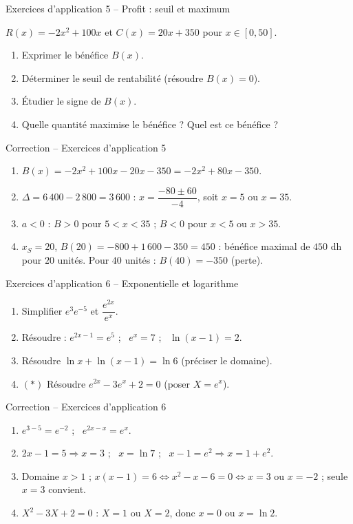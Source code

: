 \documentclass[aspectratio=169,11pt]{beamer}
\begin{document}
\begin{frame}{Exercices d'application 5 -- Profit : seuil et maximum}
	\begin{exercicebox}\small
		$R(x)=-2x^2+100x$ et $C(x)=20x+350$ pour $x\in[0,50]$.
		\begin{enumerate}
			\item Exprimer le bénéfice $B(x)$.
			\item Déterminer le seuil de rentabilité (résoudre $B(x)=0$).
			\item Étudier le signe de $B(x)$.
			\item Quelle quantité maximise le bénéfice ? Quel est ce bénéfice ?
		\end{enumerate}
	\end{exercicebox}
\end{frame}

\begin{frame}{Correction -- Exercices d'application 5}
	\small
	\begin{enumerate}
		\item $B(x)=-2x^2+100x-20x-350=-2x^2+80x-350$.
		\item $\Delta=6\,400-2\,800=3\,600$ : $x=\dfrac{-80\pm60}{-4}$, soit $x=5$ ou $x=35$.
		\item $a<0$ : $B>0$ pour $5<x<35$ ; $B<0$ pour $x<5$ ou $x>35$.
		\item $x_S=20$, $B(20)=-800+1\,600-350=450$ : bénéfice maximal de $450$ dh pour $20$ unités. Pour $40$ unités : $B(40)=-350$ (perte).
	\end{enumerate}
\end{frame}

\begin{frame}{Exercices d'application 6 -- Exponentielle et logarithme}
	\begin{exercicebox}\small
		\begin{enumerate}
			\item Simplifier $e^{3}e^{-5}$ et $\dfrac{e^{2x}}{e^{x}}$.
			\item Résoudre : $e^{2x-1}=e^5$ ; \ $e^x=7$ ; \ $\ln(x-1)=2$.
			\item Résoudre $\ln x+\ln(x-1)=\ln 6$ (préciser le domaine).
			\item $(\ast)$ Résoudre $e^{2x}-3e^x+2=0$ (poser $X=e^x$).
		\end{enumerate}
	\end{exercicebox}
\end{frame}

\begin{frame}{Correction -- Exercices d'application 6}
	\small
	\begin{enumerate}
		\item $e^{3-5}=e^{-2}$ ; \ $e^{2x-x}=e^x$.
		\item $2x-1=5\Rightarrow x=3$ ; \ $x=\ln7$ ; \ $x-1=e^2\Rightarrow x=1+e^2$.
		\item Domaine $x>1$ ; $x(x-1)=6\iff x^2-x-6=0\iff x=3$ ou $x=-2$ ; seule $x=3$ convient.
		\item $X^2-3X+2=0$ : $X=1$ ou $X=2$, donc $x=0$ ou $x=\ln2$.
	\end{enumerate}
\end{frame}
\end{document}
